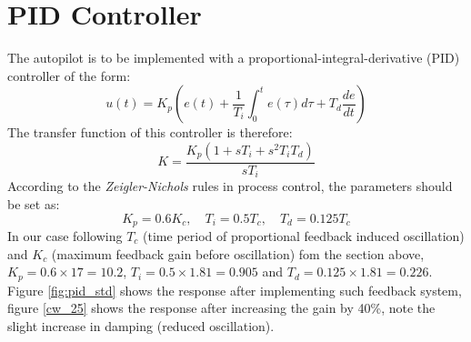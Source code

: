 \documentclass{article}
\begin{document}
\section{PID Controller}
The autopilot is to be implemented with a proportional-integral-derivative (PID) controller of the form:
\begin{equation}
	u(t)=K_p \left( e(t) + \dfrac{1}{T_i}\int_0^t e(\tau) d\tau + T_d \dfrac{de}{dt}\right)
\end{equation}
The transfer function of this controller is therefore:
\begin{equation}
	K = \dfrac{K_p(1+sT_i+s^2T_iT_d)}{sT_i}
\end{equation}
According to the \textit{Zeigler-Nichols} rules in process control, the parameters should be set as:
\begin{equation}
	K_p=0.6K_c, \quad T_i=0.5T_c, \quad T_d=0.125T_c
\end{equation}
In our case following $T_c$ (time period of proportional feedback induced oscillation) and $K_c$ (maximum feedback gain before oscillation) fom the section above, $K_p=0.6\times 17=10.2$, $T_i=0.5\times1.81=0.905$ and $T_d=0.125\times1.81=0.226$. Figure \ref{fig:pid_std} shows the response after implementing such feedback system, figure \ref{cw_25} shows the response after increasing the gain by 40\%, note the slight increase in damping (reduced oscillation).
\end{document}
